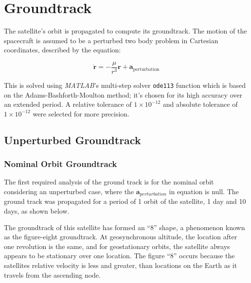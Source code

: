 \section{Groundtrack}
\label{sec:groundtrack}

The satellite's orbit is propagated to compute its groundtrack. The motion of the spacecraft is assumed to be a perturbed two body problem in Cartesian coordinates, described by the equation:

\begin{equation}
	\dot{\mathbf{r}} = -\frac{\mu}{r^3} \mathbf{r} + \mathbf{a}_{\text{perturbation}}
\end{equation}

This is solved using \textit{MATLAB}'s multi-step solver \texttt{ode113} function which is based on the Adams-Bashforth-Moulton method; it's chosen for its high accuracy over an extended period. A relative tolerance of \(1 \times 10^{-12}\) and absolute tolerance of \(1 \times 10^{-12}\) were selected for more precision.


\subsection{Unperturbed Groundtrack}

\subsubsection{Nominal Orbit Groundtrack}

The first required analysis of the ground track is for the nominal orbit considering an unperturbed case, where the $\mathbf{a}_{perturbation}$ in equation is null. The ground track was propagated for a period of 1 orbit of the satellite, 1 day and 10 days, as shown below.


The groundtrack of this satellite has formed an “8” shape, a phenomenon known as the figure-eight groundtrack. At geosynchronous altitude, the location after one revolution is the same, and for geostationary  orbits, the satellite always appears to be stationary over one location. The figure “8” occurs because the satellites relative velocity is less and greater, than locations on the Earth as it travels from the ascending node. 

